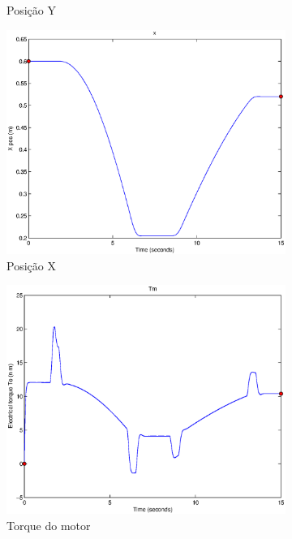 \documentclass{article}
\begin{document}
\begin{figure}[H]
\begin{subfigure}{0.3\textwidth}
		\caption{Posição Y}
	\end{subfigure}
	\begin{subfigure}{0.3\textwidth}
		\includegraphics[width=\linewidth]{matlab/x5}
		\caption{Posição X}
	\end{subfigure}
	\begin{subfigure}{0.3\textwidth}
		\includegraphics[width=\linewidth]{matlab/tm5}
		\caption{Torque do motor}
	\end{subfigure}
	\begin{subfigure}{0.3\textwidth}

\end{subfigure}
\end{figure}
\end{document}
